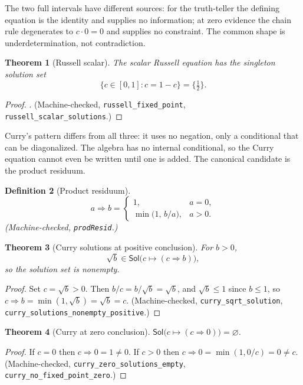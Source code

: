 \documentclass[11pt,a4paper]{article}
\newtheorem{theorem}{Theorem}[section]
\newtheorem{definition}[theorem]{Definition}
\newcommand{\Sol}{\mathsf{Sol}}
\begin{document}
The two full intervals have different sources: for the truth-teller the
defining equation is the identity and supplies no information; at zero
evidence the chain rule degenerates to $c \cdot 0 = 0$ and supplies no
constraint.
The common shape is underdetermination, not contradiction.

\begin{theorem}[Russell scalar]
\label{thm:russell}
The scalar Russell equation has the singleton solution set
\[
  \{c \in [0,1] : c = 1 - c\} = \{\tfrac12\}.
\]
\end{theorem}
\begin{proof}
.
(Machine-checked, \texttt{russell\_fixed\_point},
\texttt{russell\_scalar\_solutions}.)
\end{proof}

Curry's pattern differs from all three: it uses no negation, only a
conditional that can be diagonalized.
The algebra has no internal conditional, so the Curry equation cannot
even be written until one is added.
The canonical candidate is the product residuum.

\begin{definition}[Product residuum]
\label{def:prodresid}
\[
  a \Rightarrow b =
  \begin{cases}
    1, & a = 0,\\
    \min\!\bigl(1,\, b/a\bigr), & a > 0.
  \end{cases}
\]
(Machine-checked, \texttt{prodResid}.)
\end{definition}

\begin{theorem}[Curry solutions at positive conclusion]
\label{thm:curry-sqrt}
For $b > 0$,
\[
  \sqrt{b} \in \Sol\bigl(c \mapsto (c \Rightarrow b)\bigr),
\]
so the solution set is nonempty.
\end{theorem}
\begin{proof}
Set $c = \sqrt b > 0$.
Then $b/c = b/\sqrt b = \sqrt b$, and $\sqrt b \leq 1$ since
$b \leq 1$, so
$c \Rightarrow b = \min(1, \sqrt b) = \sqrt b = c$.
(Machine-checked, \texttt{curry\_sqrt\_solution},
\texttt{curry\_solutions\_nonempty\_positive}.)
\end{proof}

\begin{theorem}[Curry at zero conclusion]
\label{thm:curry-zero}
$\Sol\bigl(c \mapsto (c \Rightarrow 0)\bigr) = \varnothing$.
\end{theorem}
\begin{proof}
If $c = 0$ then $c \Rightarrow 0 = 1 \neq 0$.
If $c > 0$ then $c \Rightarrow 0 = \min(1, 0/c) = 0 \neq c$.
(Machine-checked, \texttt{curry\_zero\_solutions\_empty},
\texttt{curry\_no\_fixed\_point\_zero}.)
\end{proof}
\end{document}
